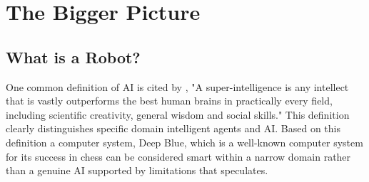 \documentclass[man]{apa6}
\begin{document}
\section{The Bigger Picture}
\subsection{What is a Robot?}
One common definition of AI is cited by , "A super-intelligence is any intellect that is vastly outperforms the best human brains in practically every field, including scientific creativity, general wisdom and social skills." This definition clearly distinguishes specific domain intelligent agents and AI. Based on this definition a computer system, Deep Blue, which is a well-known computer system for its success in chess can be considered smart within a narrow domain rather than a genuine AI supported by limitations that \citeauthor{duff} \citeyear[p.~34]{duff} speculates.\par
\end{document}
